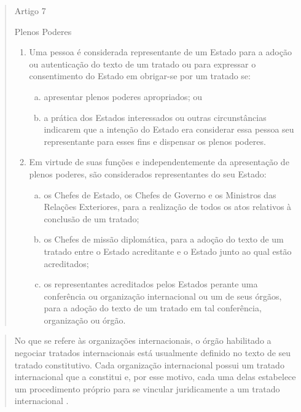 \documentclass{article}
\begin{document}
\begin{quote}
    \begin{center}
         Artigo 7

        Plenos Poderes 
    \end{center}
    
    \begin{enumerate}
        \item Uma pessoa é considerada representante de um Estado para a adoção ou autenticação do texto de um tratado ou para expressar o consentimento do Estado em obrigar-se por um tratado se: 
    
            \begin{enumerate}[a)]
                \item apresentar plenos poderes apropriados; ou 
                \item a prática dos Estados interessados ou outras circunstâncias indicarem que a intenção do Estado era considerar essa pessoa seu representante para esses fins e dispensar os plenos poderes. 
            \end{enumerate}

        \item Em virtude de suas funções e independentemente da apresentação de plenos poderes, são considerados representantes do seu Estado: 
    
            \begin{enumerate}[a)]
                \item os Chefes de Estado, os Chefes de Governo e os Ministros das Relações Exteriores, para a realização de todos os atos relativos à conclusão de um tratado; 
                \item os Chefes de missão diplomática, para a adoção do texto de um tratado entre o Estado acreditante e o Estado junto ao qual estão acreditados; 
                \item os representantes acreditados pelos Estados perante uma conferência ou organização internacional ou um de seus órgãos, para a adoção do texto de um tratado em tal conferência, organização ou órgão.
            \end{enumerate}
    
    \end{enumerate}
    \cite{brasil_decreto_2009}

\end{quote}

\begin{quote}
    No que se refere às organizações internacionais, o órgão habilitado a negociar tratados internacionais está usualmente definido no texto de seu tratado constitutivo. Cada organização internacional possui um tratado internacional que a constitui e, por esse motivo, cada uma delas estabelece um procedimento próprio para se vincular juridicamente a um tratado internacional \cite[p.~155-156]{accioly_manual_2023}.
\end{quote}
\end{document}
